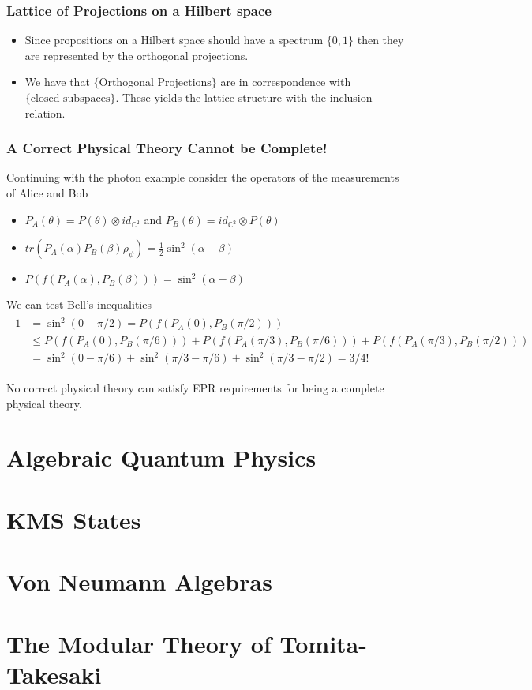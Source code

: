 \documentclass{beamer}
\theoremstyle{definition}
\begin{document}
\begin{frame}

\frametitle{Lattice of Projections on a Hilbert space}

\begin{itemize}

\item Since propositions on a Hilbert space should have a spectrum $\{0,1\}$ then they are represented by the orthogonal projections.

\item We have that $\{\text{Orthogonal Projections}\}$ are in correspondence with $\{\text{closed subspaces}\}$. These yields the lattice structure with the inclusion relation.

\end{itemize}

\end{frame}

\begin{frame}

\frametitle{A Correct Physical Theory Cannot be Complete!}

Continuing with the photon example consider the operators of the measurements of Alice and Bob

\begin{itemize}

\item $P_A(\theta)=P(\theta)\otimes id_{\mathbb{C}^2}$ and $P_B(\theta)=id_{\mathbb{C}^2}\otimes P(\theta)$

\item $tr(P_A(\alpha)P_B(\beta)\rho_\psi) = \frac{1}{2}\sin^2(\alpha-\beta)$

\item $P(f(P_A(\alpha),P_B(\beta)))=\sin^2(\alpha-\beta)$

\end{itemize}

We can test Bell's inequalities
\begin{align}
\begin{split}
1&=\sin^2(0-\pi/2)= P(f(P_A(0),P_B(\pi/2)))\\ 
&\leq P(f(P_A(0),P_B(\pi/6)))+P(f(P_A(\pi/3),P_B(\pi/6)))+P(f(P_A(\pi/3),P_B(\pi/2)))  \\ 
&=\sin^2(0-\pi/6) + \sin^2(\pi/3-\pi/6) + \sin^2(\pi/3-\pi/2) = 3/4!
\end{split}
\end{align}

No correct physical theory can satisfy EPR requirements for being a complete physical theory.

\end{frame}

\section{Algebraic Quantum Physics}

\section{KMS States}

\section{Von Neumann Algebras}

\section{The Modular Theory of Tomita-Takesaki}
\end{document}
